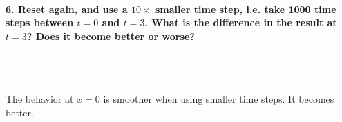 \paragraph{6. Reset again, and use a $10\times$ smaller 
    time step, i.e. take 1000 time steps between $t=0$ and 
    $t=3$. What is the difference in the result at $t=3$? 
    Does it become better or worse?
} \ \\
    \begin{figure}[h!]
        \centering
        \begin{minipage}{.5\linewidth}
          \centering
        \end{minipage}%
        \begin{minipage}{.5\linewidth}
          \centering
        \end{minipage}
    \end{figure} \ \\
    The behavior at $x=0$ is smoother when using 
    smaller time steps. It becomes better.

